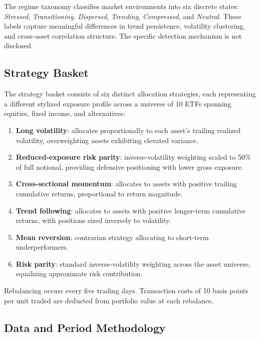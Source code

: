 \documentclass[12pt]{article}
\begin{document}
The regime taxonomy classifies market environments into six discrete states: \textit{Stressed}, \textit{Transitioning}, \textit{Dispersed}, \textit{Trending}, \textit{Compressed}, and \textit{Neutral}.
These labels capture meaningful differences in trend persistence, volatility clustering, and cross-asset correlation structure.
The specific detection mechanism is not disclosed.

\subsection{Strategy Basket}

The strategy basket consists of six distinct allocation strategies, each representing a different stylized exposure profile across a universe of 10 ETFs spanning equities, fixed income, and alternatives:

\begin{enumerate}
    \item \textbf{Long volatility}: allocates proportionally to each asset's trailing realized volatility, overweighting assets exhibiting elevated variance.
    \item \textbf{Reduced-exposure risk parity}: inverse-volatility weighting scaled to 50\% of full notional, providing defensive positioning with lower gross exposure.
    \item \textbf{Cross-sectional momentum}: allocates to assets with positive trailing cumulative returns, proportional to return magnitude.
    \item \textbf{Trend following}: allocates to assets with positive longer-term cumulative returns, with positions sized inversely to volatility.
    \item \textbf{Mean reversion}: contrarian strategy allocating to short-term underperformers.
    \item \textbf{Risk parity}: standard inverse-volatility weighting across the asset universe, equalizing approximate risk contribution.
\end{enumerate}

\noindent
Rebalancing occurs every five trading days.
Transaction costs of 10 basis points per unit traded are deducted from portfolio value at each rebalance.

\subsection{Data and Period Methodology}
\label{sec:methodology}
\end{document}
